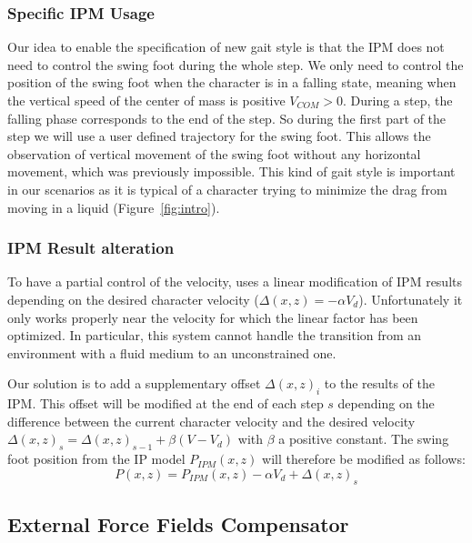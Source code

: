 \documentclass[conference]{acmsiggraph}
\begin{document}
\subsubsection{Specific IPM Usage}
\label{sec:specific_ipm}

Our idea to enable the specification of new gait style is that the IPM does not need to control the swing foot during the whole step. We only need to control the position of the swing foot when the character is in a falling state, meaning when the vertical speed of the center of mass is positive $V_{COM}>0$. During a step, the falling phase corresponds to the end of the step. So during the first part of the step we will use a user defined trajectory for the swing foot. This allows the observation of vertical movement of the swing foot without any horizontal movement, which was previously impossible. This kind of gait style is important in our scenarios as it is typical of a character trying to minimize the drag from moving in a liquid (Figure~\ref{fig:intro}).

\subsubsection{IPM Result alteration}
\label{sec:ipm_alt}

To have a partial control of the velocity, \cite{coros2010generalized} uses a linear modification of IPM results depending on the desired character velocity ($\Delta(x,z)=-\alpha V_d$). Unfortunately it only works properly near the velocity for which the linear factor has been optimized. In particular, this system cannot handle the transition from an environment with a fluid medium to an unconstrained one.

Our solution is to add a supplementary offset $\Delta(x,z)_i$ to the results of the IPM. This offset will be modified at the end of each step $s$ depending on the difference between the current character velocity and the desired velocity $\Delta(x,z)_s = \Delta(x,z)_{s-1}+\beta(V-V_d)$ with $\beta$ a positive constant. The swing foot position from the IP model $P_{IPM}(x,z)$ will therefore be modified as follows:
$$
P(x,z) = P_{IPM}(x,z) - \alpha V_d + \Delta(x,z)_s
$$ 

\subsection{External Force Fields Compensator}
\label{sec:ext_force_comp}
\end{document}
